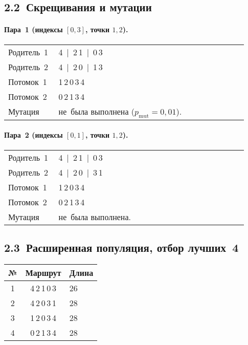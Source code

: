 \documentclass[a4paper,12pt]{article}
\begin{document}
\subsection*{2.2 Скрещивания и мутации}

\paragraph{Пара 1 (индексы $[0,3]$, точки $1,2$).}
\begin{longtable}{@{}p{0.18\linewidth}p{0.75\linewidth}@{}}
Родитель 1 & 4 \,|\, 2\,1 \,|\, 0\,3\\
Родитель 2 & 4 \,|\, 2\,0 \,|\, 1\,3\\
Потомок 1  & 1\,2\,0\,3\,4\\
Потомок 2  & 0\,2\,1\,3\,4\\
Мутация    & не была выполнена ($p_{\text{mut}}=0{,}01$).\\
\end{longtable}

\paragraph{Пара 2 (индексы $[0,1]$, точки $1,2$).}
\begin{longtable}{@{}p{0.18\linewidth}p{0.75\linewidth}@{}}
Родитель 1 & 4 \,|\, 2\,1 \,|\, 0\,3\\
Родитель 2 & 4 \,|\, 2\,0 \,|\, 3\,1\\
Потомок 1  & 1\,2\,0\,3\,4\\
Потомок 2  & 0\,2\,1\,3\,4\\
Мутация    & не была выполнена.\\
\end{longtable}

\subsection*{2.3 Расширенная популяция, отбор лучших 4}

\begin{center}
\begin{tabular}{ccl}
\toprule
№ & Маршрут & Длина\\\midrule
1 & 4\,2\,1\,0\,3 & 26\\
2 & 4\,2\,0\,3\,1 & 28\\
3 & 1\,2\,0\,3\,4 & 28\\
4 & 0\,2\,1\,3\,4 & 28\\
\bottomrule
\end{tabular}
\end{center}
\end{document}
